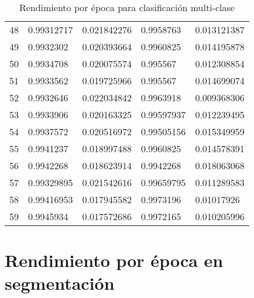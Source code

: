 \begin{table}[H]
{\begin{tabular}{@{}lllll@{}}
    48 & 0.99312717 & 0.021842276 & 0.9958763 & 0.013121387 \\
    49 & 0.9932302 & 0.020393664 & 0.9960825 & 0.014195878 \\
    50 & 0.9934708 & 0.020075574 & 0.995567 & 0.012308854 \\
    51 & 0.9933562 & 0.019725966 & 0.995567 & 0.014699074 \\
    52 & 0.9932646 & 0.022034842 & 0.9963918 & 0.009368306 \\
    53 & 0.9933906 & 0.020163325 & 0.99597937 & 0.012239495 \\
    54 & 0.9937572 & 0.020516972 & 0.99505156 & 0.015349959 \\
    55 & 0.9941237 & 0.018997488 & 0.9960825 & 0.014578391 \\
    56 & 0.9942268 & 0.018623914 & 0.9942268 & 0.018063068 \\
    57 & 0.99329895 & 0.021542616 & 0.99659795 & 0.011289583 \\
    58 & 0.99416953 & 0.017945582 & 0.9973196 & 0.01017926 \\
    59 & 0.9945934 & 0.017572686 & 0.9972165 & 0.010205996 \\ \bottomrule
    \end{tabular}%
    }
    \caption{Rendimiento por época para clasificación multi-clase}
    \label{tabla:rendimiento_7}
    \end{table}

    \section{Rendimiento por época en segmentación}

